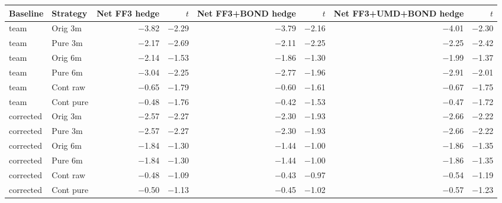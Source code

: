 \begin{tabular}{llrrrrrr}
\toprule
Baseline & Strategy & Net FF3 hedge & $t$ & Net FF3+BOND hedge & $t$ & Net FF3+UMD+BOND hedge & $t$ \\
\midrule
team & Orig 3m & $-$3.82 & $-$2.29 & $-$3.79 & $-$2.16 & $-$4.01 & $-$2.30 \\
team & Pure 3m & $-$2.17 & $-$2.69 & $-$2.11 & $-$2.25 & $-$2.25 & $-$2.42 \\
team & Orig 6m & $-$2.14 & $-$1.53 & $-$1.86 & $-$1.30 & $-$1.99 & $-$1.37 \\
team & Pure 6m & $-$3.04 & $-$2.25 & $-$2.77 & $-$1.96 & $-$2.91 & $-$2.01 \\
team & Cont raw & $-$0.65 & $-$1.79 & $-$0.60 & $-$1.61 & $-$0.67 & $-$1.75 \\
team & Cont pure & $-$0.48 & $-$1.76 & $-$0.42 & $-$1.53 & $-$0.47 & $-$1.72 \\
corrected & Orig 3m & $-$2.57 & $-$2.27 & $-$2.30 & $-$1.93 & $-$2.66 & $-$2.22 \\
corrected & Pure 3m & $-$2.57 & $-$2.27 & $-$2.30 & $-$1.93 & $-$2.66 & $-$2.22 \\
corrected & Orig 6m & $-$1.84 & $-$1.30 & $-$1.44 & $-$1.00 & $-$1.86 & $-$1.35 \\
corrected & Pure 6m & $-$1.84 & $-$1.30 & $-$1.44 & $-$1.00 & $-$1.86 & $-$1.35 \\
corrected & Cont raw & $-$0.48 & $-$1.09 & $-$0.43 & $-$0.97 & $-$0.54 & $-$1.19 \\
corrected & Cont pure & $-$0.50 & $-$1.13 & $-$0.45 & $-$1.02 & $-$0.57 & $-$1.23 \\
\bottomrule
\end{tabular}
